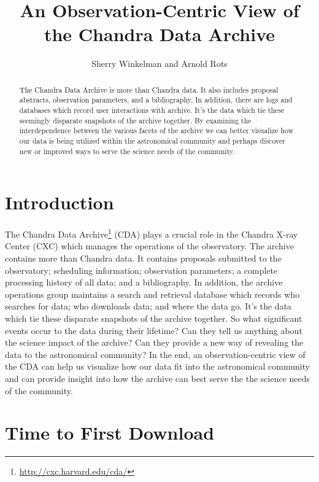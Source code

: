 
\resetcounters


\title{An Observation-Centric View of the Chandra Data Archive}
\author{Sherry Winkelman and Arnold Rots}


\begin{abstract}
The Chandra Data Archive is more than Chandra data. It also includes proposal abstracts, observation parameters, and a bibliography.  In addition, there are logs and databases which record user interactions with archive.  It's the data which tie these seemingly disparate snapshots of the archive together.  By examining the interdependence between the various facets of the archive we can better visualize how our data is being utilized within the astronomical community and perhaps discover new or improved ways to serve the science needs of the community.

\end{abstract}

\section{Introduction}
The Chandra Data Archive\footnote{\url{http://cxc.harvard.edu/cda/}} (CDA) plays a crucial role in the Chandra X-ray Center (CXC) which manages the operations of the observatory.  The archive contains more than Chandra data.  It contains proposals submitted to the observatory; scheduling information; observation parameters; a complete processing history of all data; and a bibliography.  In addition, the archive operations group maintains a search and retrieval database which records who searches for data; who downloads data; and where the data go.  It's the data which tie these disparate snapshots of the archive together.  So what significant events occur to the data during their lifetime? Can they tell us anything about the science impact of the archive? Can they provide a new way of revealing the data to the astronomical community?  In the end, an observation-centric view of the CDA can help us visualize how our data fit into the astronomical community and can provide insight into how the archive can best serve the the science needs of the community.

\section{Time to First Download}
\label{sec:Time2FirstDownload}

